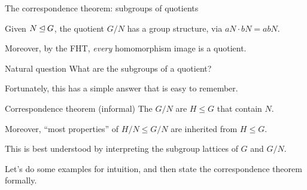 \documentclass[8pt, handout]{beamer}
\newcommand{\Pause}{}      %
\begin{document}
\begin{frame}{The correspondence theorem: subgroups of quotients}
  
  Given $N\unlhd G$, the quotient $G/N$ has a group structure, via
  $aN\cdot bN=abN$. \medskip\Pause
  
  Moreover, by the FHT, \emph{every} homomorphism image is a
  quotient. \smallskip\Pause
  
  \begin{exampleblock}{Natural question}
    What are the subgroups of a quotient?
  \end{exampleblock}
  
  \smallskip\Pause
  
  Fortunately, this has a simple answer that is easy to remember.
  
  \smallskip\Pause
  
  \begin{alertblock}{Correspondence theorem (informal)}
    The  $G/N$ are  $H\leq G$ that contain $N$. \medskip\Pause
    
    Moreover, ``most properties'' of $H/N\leq G/N$ are inherited from $H\leq G$.
  \end{alertblock}
  
  \smallskip\Pause
  
  This is best understood by interpreting the subgroup lattices of $G$
  and $G/N$.
  
  \medskip\Pause
  
  Let's do some examples for intuition, and then state the
  correspondence theorem formally.
  
\end{frame}

\end{document}
